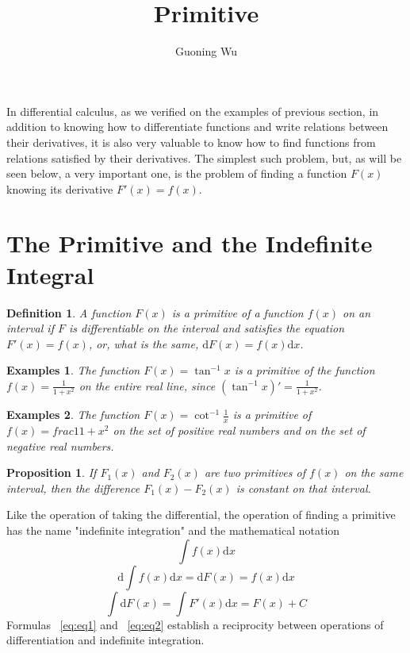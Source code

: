 \documentclass[a4paper,12pt]{article} %
\title{Primitive}
\author{Guoning Wu}
\newtheorem{definition}{Definition}[section]
\newtheorem{proposition}{Proposition}[section]
\newtheorem{example}{Examples}
\begin{document}
\tableofcontents
\setcounter{tocdepth}{2}
\listoffigures
\listoftables
\maketitle
\theoremstyle{definition}

In differential calculus, as we verified on the examples of previous
section, in addition to knowing how to differentiate functions and 
write relations between their derivatives, it is also very valuable 
to know how to find functions from relations satisfied by their 
derivatives. The simplest such problem, but, as will be seen below, 
a very important one, is the problem of finding a function $F(x)$ knowing 
its derivative $F'(x) = f(x)$.

\section{\rm \textbf{The Primitive and the Indefinite Integral}}

\begin{definition}
    \normalfont 
    A function $F(x)$ is a primitive of a function $f(x)$ on an interval 
    if $F$ is differentiable on the interval and satisfies the equation 
    $F'(x) = f(x)$, or, what is the same, $\mathrm{d}F(x) = f(x)\mathrm{d}x$.
\end{definition}

\begin{example}
    \normalfont
    The function $F(x) = \tan^{-1}x$ is a primitive of the function 
    $f(x) = \frac{1}{1+x^2}$ on the entire real line, since $\left(\tan^{-1}x\right)' = 
    \frac{1}{1+x^2}$.
\end{example}

\begin{example}
    \normalfont 
    The function $F(x) = \cot^{-1}\frac{1}{x}$ is a primitive of $f(x)
    =frac{1}{1+x^2}$ on the set of positive real numbers and on the 
    set of negative real numbers.
\end{example}

\begin{proposition}
    \normalfont 
    If $F_1(x)$ and $F_2(x)$ are two primitives of $f(x)$ on the same interval,
    then the difference $F_1(x) - F_2(x)$ is constant on that interval.
\end{proposition}

Like the operation of taking the differential, the operation of 
finding a primitive has the name "indefinite integration" and 
the mathematical notation 
\begin{equation}
    \int f(x)\mathrm{d}x
\end{equation}
\begin{equation}
    \mathrm{d}\int f(x) \mathrm{d}x = \mathrm{d}F(x) = f(x)\mathrm{d}x
    \label{eq:eq1}
\end{equation}
\begin{equation}
    \int\mathrm{d}F(x) = \int F'(x)\mathrm{d}x = F(x) + C
    \label{eq:eq2}
\end{equation}
Formulas ~\ref{eq:eq1} and ~\ref{eq:eq2} establish a reciprocity 
between operations of differentiation and indefinite integration.
\end{document}
